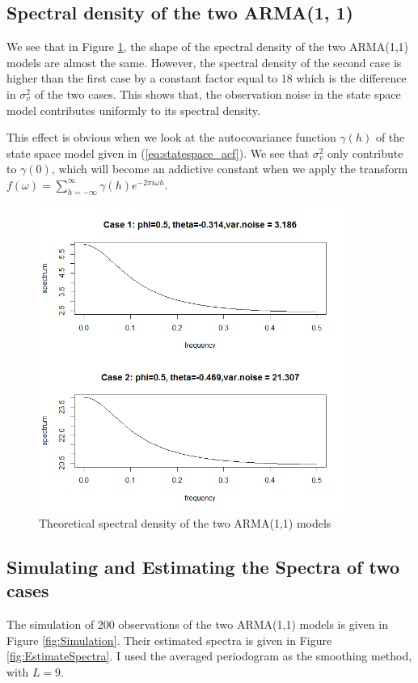 \subsection{Spectral density of the two ARMA(1, 1)}

We see that in Figure \ref{fig:SpectralDensity2ARMA}, the shape of the spectral density of the two ARMA(1,1) models are almost the same. However, the spectral density of the second case is higher than the first case by a constant factor equal to $18$ which is the difference in $\sigma^2_v$ of the two cases. This shows that, the observation noise in the state space model contributes uniformly to its spectral density. 

This effect is obvious when we look at the autocovariance function $\gamma(h)$ of the state space model given in (\ref{eq:statespace_acf}). We see that $\sigma^2_v$ only contribute to $\gamma(0)$, which will become an addictive constant when we apply the transform $f(\omega) = \sum_{h = -\infty}^{\infty} \gamma(h) e^{-2 \pi i \omega h}$.

\begin{figure}
	\centering
	\includegraphics[width=10cm]{Figures/Problem5_1}
	\caption{Theoretical spectral density of the two ARMA(1,1) models}
	\label{fig:SpectralDensity2ARMA}
\end{figure}

\subsection{Simulating and Estimating the Spectra of two cases}
The simulation of 200 observations of the two ARMA(1,1) models is given in Figure \ref{fig:Simulation}. Their estimated spectra is given in Figure \ref{fig:EstimateSpectra}. I used the averaged periodogram as the smoothing method, with $L = 9$.

